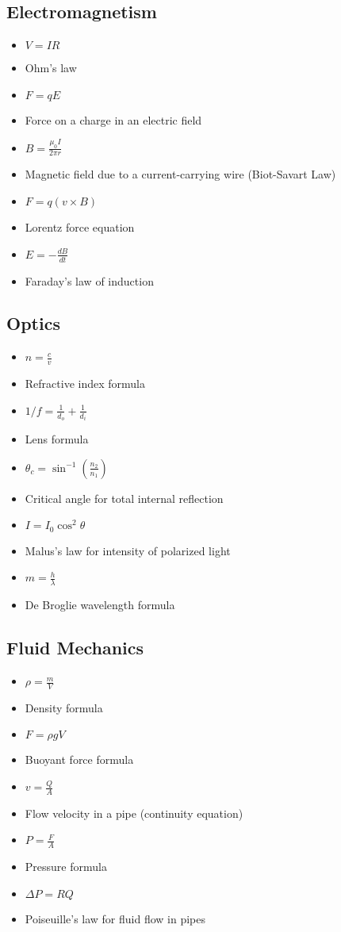 \documentclass[10pt]{article}
\begin{document}
\begin{multicols*}{3}
        \subsection*{Electromagnetism}
\begin{itemize}\footnotesize
        \item $V = IR$
\item[] Ohm's law
\item $F = qE$
\item[] Force on a charge in an electric field
\item $B = \frac{\mu_0 I}{2\pi r}$
\item[] Magnetic field due to a current-carrying wire (Biot-Savart Law)
\item $F = q(v \times B)$
\item[] Lorentz force equation
\item $E = - \frac{dB}{dt}$
\item[] Faraday's law of induction
\end{itemize}
        \subsection*{Optics}
\begin{itemize}\footnotesize
        \item $n = \frac{c}{v}$
\item[] Refractive index formula
\item $1/f = \frac{1}{d_o} + \frac{1}{d_i}$
\item[] Lens formula
\item $\theta_c = \sin^{-1} \left( \frac{n_2}{n_1} \right)$
\item[] Critical angle for total internal reflection
\item $I = I_0 \cos^2 \theta$
\item[] Malus's law for intensity of polarized light
\item $m = \frac{h}{\lambda}$
\item[] De Broglie wavelength formula
\end{itemize}
        \subsection*{Fluid Mechanics}
\begin{itemize}\footnotesize
        \item $\rho = \frac{m}{V}$
\item[] Density formula
\item $F = \rho g V$
\item[] Buoyant force formula
\item $v = \frac{Q}{A}$
\item[] Flow velocity in a pipe (continuity equation)
\item $P = \frac{F}{A}$
\item[] Pressure formula
\item $\Delta P = R Q$
\item[] Poiseuille's law for fluid flow in pipes
\end{itemize}

\end{multicols*}
\end{document}
